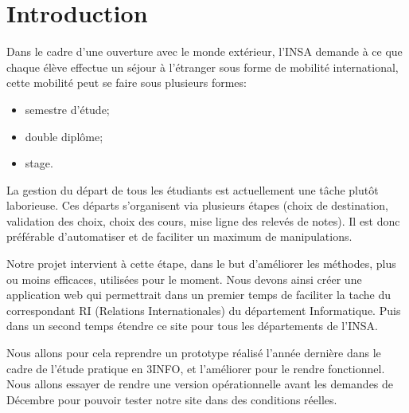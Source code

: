 \chapter*{Introduction}
Dans le cadre d'une ouverture avec le monde extérieur, l'INSA demande à ce que chaque élève effectue un séjour à l’étranger sous forme de mobilité international, cette mobilité peut se faire sous plusieurs formes:
\begin{itemize}
\item semestre d'étude;
\item double diplôme;
\item stage.
\end{itemize}

La gestion du départ de tous les étudiants est actuellement une tâche plutôt laborieuse.
Ces départs s'organisent via plusieurs étapes (choix de destination, validation des choix, choix des cours, mise ligne des relevés de notes). Il est donc préférable d'automatiser et de faciliter un maximum de manipulations.

Notre projet intervient à cette étape, dans le but d'améliorer les méthodes, plus ou moins efficaces, utilisées pour le moment. Nous devons ainsi créer une application web qui permettrait dans un premier temps de faciliter la tache du correspondant RI (Relations Internationales) du département Informatique. Puis dans un second temps étendre ce site pour tous les départements de l'INSA.

Nous allons pour cela reprendre un prototype réalisé l'année dernière dans le cadre de l'étude pratique en 3INFO, et l'améliorer pour le rendre fonctionnel.
Nous allons essayer de rendre une version opérationnelle avant les demandes de Décembre pour pouvoir tester notre site dans des conditions réelles.
